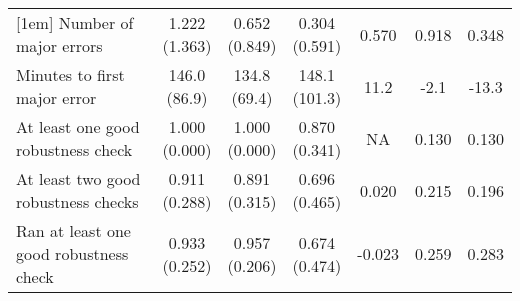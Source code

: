 \begin{table}[ht]
{\begin{tabular}{lcccccc}
[1em]
Number of major errors & \shortstack{1.222\\(1.363)} & \shortstack{0.652\\(0.849)} & \shortstack{0.304\\(0.591)} & \shortstack{0.570\\\relax[0.018]} & \shortstack{0.918\\\relax[\textless0.001]} & \shortstack{0.348\\\relax[0.025]}\\
[1em]
Minutes to first major error & \shortstack{146.0\\(86.9)} & \shortstack{134.8\\(69.4)} & \shortstack{148.1\\(101.3)} & \shortstack{11.2\\\relax[0.626]} & \shortstack{-2.1\\\relax[0.950]} & \shortstack{-13.3\\\relax[0.661]}\\
[1em]
At least one good robustness check & \shortstack{1.000\\(0.000)} & \shortstack{1.000\\(0.000)} & \shortstack{0.870\\(0.341)} & \shortstack{NA\\\relax[NA]} & \shortstack{0.130\\\relax[0.012]} & \shortstack{0.130\\\relax[0.011]}\\
[1em]
At least two good robustness checks & \shortstack{0.911\\(0.288)} & \shortstack{0.891\\(0.315)} & \shortstack{0.696\\(0.465)} & \shortstack{0.020\\\relax[0.755]} & \shortstack{0.215\\\relax[0.010]} & \shortstack{0.196\\\relax[0.020]}\\
[1em]
Ran at least one good robustness check & \shortstack{0.933\\(0.252)} & \shortstack{0.957\\(0.206)} & \shortstack{0.674\\(0.474)} & \shortstack{-0.023\\\relax[0.632]} & \shortstack{0.259\\\relax[0.002]} & \shortstack{0.283\\\relax[\textless0.001]}\\

\end{tabular}}
\end{table}
